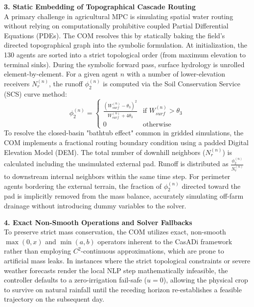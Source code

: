 \documentclass[11pt, a4paper]{article}
\begin{document}
\textbf{3. Static Embedding of Topographical Cascade Routing} \\
A primary challenge in agricultural MPC is simulating spatial water routing without relying on computationally prohibitive coupled Partial Differential Equations (PDEs). The COM resolves this by statically baking the field's directed topographical graph into the symbolic formulation. At initialization, the 130 agents are sorted into a strict topological order (from maximum elevation to terminal sinks). During the symbolic forward pass, surface hydrology is unrolled element-by-element. For a given agent $n$ with a number of lower-elevation receivers $N_r^{(n)}$, the runoff $\phi_2^{(n)}$ is computed via the Soil Conservation Service (SCS) curve method:
\begin{equation}
    \phi_2^{(n)} = 
    \begin{cases} 
        \frac{(W_{surf}^{(n)} - \theta_3)^2}{W_{surf}^{(n)} + 4\theta_3} & \text{if } W_{surf}^{(n)} > \theta_3 \\
        0 & \text{otherwise}
    \end{cases}
\end{equation}
To resolve the closed-basin "bathtub effect" common in gridded simulations, the COM implements a fractional routing boundary condition using a padded Digital Elevation Model (DEM). The total number of downhill neighbors ($N_r^{(n)}$) is calculated including the unsimulated external pad. Runoff is distributed as $\frac{\phi_2^{(n)}}{N_r^{(n)}}$ to downstream internal neighbors within the same time step. For perimeter agents bordering the external terrain, the fraction of $\phi_2^{(n)}$ directed toward the pad is implicitly removed from the mass balance, accurately simulating off-farm drainage without introducing dummy variables to the solver.

\textbf{4. Exact Non-Smooth Operations and Solver Fallbacks} \\
To preserve strict mass conservation, the COM utilizes exact, non-smooth $\max(0, x)$ and $\min(a,b)$ operators inherent to the CasADi framework rather than employing $C^2$-continuous approximations, which are prone to artificial mass leaks. In instances where the strict topological constraints or severe weather forecasts render the local NLP step mathematically infeasible, the controller defaults to a zero-irrigation fail-safe ($u = 0$), allowing the physical crop to survive on natural rainfall until the receding horizon re-establishes a feasible trajectory on the subsequent day.
\end{document}
